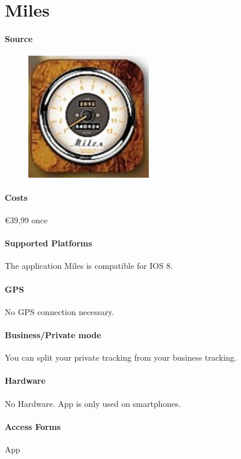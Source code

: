 \section{Miles} \cite{miles}
\paragraph{Source} 
\begin{figure}
  \begin{center}
    \includegraphics[width=0.48\textwidth]{miles}
  \end{center}
\end{figure}
\paragraph{Costs} \euro 39,99 once
\paragraph{Supported Platforms} The application Miles is compatible for IOS 8.
\paragraph{GPS} No GPS connection necessary.
\paragraph{Business/Private mode} You can split your private tracking from your business tracking.
\paragraph{Hardware} No Hardware. App is only used on smartphones.
\paragraph{Access Forms} App
